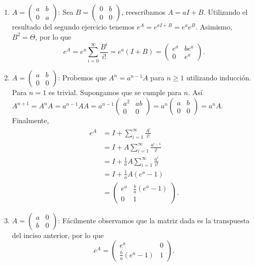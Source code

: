 \documentclass{article}
\theoremstyle{definition}
\theoremstyle{remark}
\begin{document}
\begin{enumerate}
  \item
    $ A = \begin{pmatrix} a & b \\ 0 & a \end{pmatrix}$:
    Sea $B = \begin{pmatrix}0 & b \\ 0 & 0\end{pmatrix}$,
    reescribamos $A = a I + B$.
    Utilizando el resultado del segundo ejercicio tenemos
    $
      e^A = e^{aI + B} = e^a e^B.
    $
    Asimismo, $B^2 = \Theta$, por lo que
    \[
      e^A = e^a \sum_{i = 0}^{\infty} \frac{B^i}{i!} = e^a (I + B) =
      \begin{pmatrix} e^a & b e^a \\ 0 & e^a \end{pmatrix}.
    \]
  \item
    $ A = \begin{pmatrix} a & b \\ 0 & 0 \end{pmatrix}$:
    Probemos que $A^n = a^{n - 1} A$ para $n \geq 1$ utilizando inducci\'on.
    Para $n = 1$ es trivial. Supongamos que se cumple para $n$. As\'i
    $
    A^{n + 1} = A^n A = a^{n - 1} A A =
    a^{n - 1} \begin{pmatrix} a^2 & ab \\ 0 & 0 \end{pmatrix} =
    a^n \begin{pmatrix} a & b \\ 0 & 0 \end{pmatrix} =
    a^n A.
    $
    Finalmente,
    \begin{align*}
      e^A &= I + \sum_{i = 1}^{\infty} \frac{A^i}{i!}\\
      &= I + A \sum_{i = 1}^{\infty} \frac{a^{i - 1}}{i!}\\
      &= I + \frac{1}{a} A \sum_{i = 1}^{\infty} \frac{a^i}{i!}\\
      &= I + \frac{1}{a} A (e^a - 1)\\
      &= \begin{pmatrix} e^a & \frac{b}{a}(e^a - 1) \\ 0 & 1\end{pmatrix}.
    \end{align*}
  \item
    $A = \begin{pmatrix} a & 0 \\ b & 0 \end{pmatrix}$:
    F\'acilmente observamos que la matriz dada es la transpuesta del inciso anterior, por lo que
    \[
      e^A = \begin{pmatrix} e^a & 0 \\ \frac{b}{a}(e^a - 1) & 1 \end{pmatrix}.
    \]
\end{enumerate}
\end{document}
